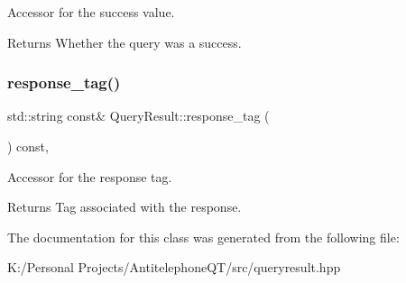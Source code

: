Accessor for the success value. 

\begin{DoxyReturn}{Returns}
Whether the query was a success. 
\end{DoxyReturn}
\mbox{\label{class_query_result_a3d238ce0ccc659d2918dac0479937d3c}} 
\subsubsection{\texorpdfstring{response\+\_\+tag()}{response\_tag()}}
{\footnotesize\ttfamily std\+::string const\& Query\+Result\+::response\+\_\+tag (\begin{DoxyParamCaption}{ }\end{DoxyParamCaption}) const\hspace{0.3cm}{\ttfamily [inline]}, {\ttfamily [noexcept]}}



Accessor for the response tag. 

\begin{DoxyReturn}{Returns}
Tag associated with the response. 
\end{DoxyReturn}


The documentation for this class was generated from the following file\+:\begin{DoxyCompactItemize}
\item 
K\+:/\+Personal Projects/\+Antitelephone\+Q\+T/src/queryresult.\+hpp\end{DoxyCompactItemize}
